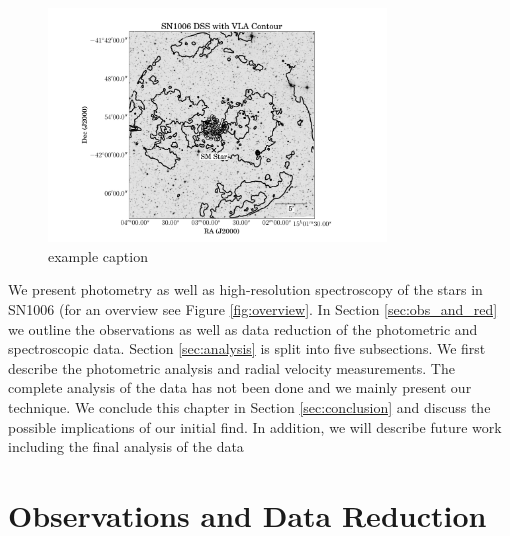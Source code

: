 \begin{figure}[htbp] %
   \centering
   \includegraphics[width=0.8\textwidth]{chapter_sn1006/plots/sn1006_overlay_withsm.pdf} 
   \caption{example caption}
   \label{fig:overview_sn1006}
\end{figure}

We present photometry as well as high-resolution spectroscopy of the stars in SN1006 (for an overview see Figure \ref{fig:overview}. In Section \ref{sec:obs_and_red} we outline the observations as well as data reduction of the photometric and spectroscopic data. Section \ref{sec:analysis} is split into five subsections. We first describe the photometric analysis and radial velocity measurements. The complete analysis of the data has not been done and we mainly present our technique. We conclude this chapter in Section \ref{sec:conclusion} and discuss the possible implications of our initial find. In addition, we will describe future work including the final analysis of the data 


\section{Observations and Data Reduction}

